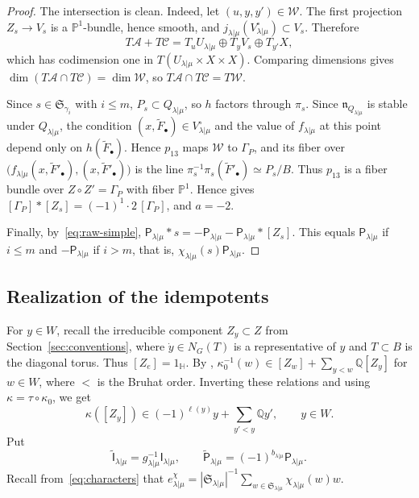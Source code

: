 \documentclass[11pt,a4paper]{amsart}
\theoremstyle{definition}
\theoremstyle{remark}
\newcommand{\Q}{\mathbb Q}
\newcommand{\bH}{\mathbb H}
\newcommand{\lm}{\lambda|\mu}
\numberwithin{equation}{section}
\begin{document}
\begin{proof}
The intersection is clean. Indeed, let $(u,y,y')\in \mathscr W$. The first
projection $Z_s\to V_s$ is a $\mathbb P^1$-bundle, hence smooth, and
$j_{\lm}(V^\circ_{\lm})\subset V_s$. Therefore
$$
T\mathscr A+T\mathscr C=T_uU_{\lm}\oplus T_yV_s\oplus T_{y'}X,
$$
which has codimension one in $T(U_{\lm}\times X\times X)$. Comparing
dimensions gives $\dim(T\mathscr A\cap T\mathscr C)=\dim \mathscr W$, so
$T\mathscr A\cap T\mathscr C=T\mathscr W$.

Since $s\in\mathfrak S_{\gamma_i}$ with $i\le m$, $P_s\subset Q_{\lm}$, so $h$
factors through $\pi_s$. Since $\mathfrak n_{Q_{\lm}}$ is stable under
$Q_{\lm}$, the condition $(x,\widetilde F_\bullet)\in V^\circ_{\lm}$ and the
value of $f_{\lm}$ at this point depend only on $h(\widetilde F_\bullet)$. Hence $p_{13}$
maps $\mathscr W$ to $\Gamma_P$, and its fiber over
$\bigl(f_{\lm}(x,\widetilde F'_\bullet),(x,\widetilde F'_\bullet)\bigr)$ is
the line $\pi_s^{-1}\pi_s(\widetilde F'_\bullet)\simeq P_s/B$. Thus $p_{13}$
is a fiber bundle over $Z\circ Z'=\Gamma_P$ with fiber $\mathbb P^1$. Hence
\cite[Lemma~8.5]{Nak} gives $[\Gamma_P]*[Z_s]=(-1)^1\cdot2\,[\Gamma_P]$,
and $a=-2$.

Finally, by~\eqref{eq:raw-simple},
$\mathsf P_{\lm}*s=-\mathsf P_{\lm}-\mathsf P_{\lm}*[Z_s]$. This equals
$\mathsf P_{\lm}$ if $i\le m$ and $-\mathsf P_{\lm}$ if $i>m$, that is,
$\chi_{\lm}(s)\mathsf P_{\lm}$.
\end{proof}

\subsection{Realization of the idempotents}
\label{sec:projectors}

For $y\in W$, recall the irreducible component $Z_y\subset Z$ from
Section~\ref{sec:conventions}, where $\dot y\in N_G(T)$ is a
representative of $y$ and $T\subset B$ is the diagonal torus. Thus
$[Z_e]=1_{\bH}$. By \cite[Section~3.4]{CG},
$\kappa_0^{-1}(w)\in[Z_w]+\sum_{y<w}\Q[Z_y]$ for $w\in W$, where $<$ is
the Bruhat order. Inverting these relations and using
$\kappa=\tau\circ\kappa_0$, we get
$$
\kappa([Z_y])\in(-1)^{\ell(y)}y+\sum_{y'<y}\Q y',\qquad y\in W.
$$
Put
\begin{equation}\label{eq:normalization}
\widetilde{\mathsf I}_{\lm}=g_{\lm}^{-1}\mathsf I_{\lm},\qquad \widetilde{\mathsf P}_{\lm}=(-1)^{b_{\lm}}\mathsf P_{\lm}.
\end{equation}
Recall from~\eqref{eq:characters} that
$e_{\lm}^\chi=|\mathfrak S_{\lm}|^{-1}\sum_{w\in\mathfrak S_{\lm}}\chi_{\lm}(w)w$.
\end{document}
